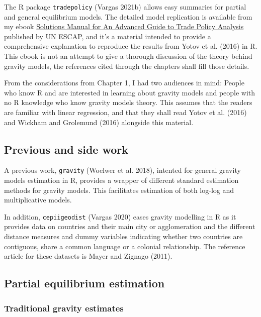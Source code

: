 \documentclass[12pt,reqno,oneside,pdftex]{formato-puc/puctesis} %
\begin{document}
The R package \texttt{tradepolicy} (Vargas 2021b) allows easy summaries
for partial and general equilibrium models. The detailed model
replication is available from my ebook
\href{https://r.tiid.org/R_structural_gravity/}{Solutions Manual for An
Advanced Guide to Trade Policy Analysis} published by UN ESCAP, and it's
a material intended to provide a comprehensive explanation to reproduce
the results from Yotov et al. (2016) in R. This ebook is not an attempt
to give a thorough discussion of the theory behind gravity models, the
references cited through the chapters shall fill those details.

From the considerations from Chapter 1, I had two audiences in mind:
People who know R and are interested in learning about gravity models
and people with no R knowledge who know gravity models theory. This
assumes that the readers are familiar with linear regression, and that
they shall read Yotov et al. (2016) and Wickham and Grolemund (2016)
alongside this material.

\hypertarget{previous-and-side-work}{%
\subsection{Previous and side work}\label{previous-and-side-work}}

A previous work, \texttt{gravity} (Woelwer et al. 2018), intented for
general gravity models estimation in R, provides a wrapper of different
standard estimation methods for gravity models. This facilitates
estimation of both log-log and multiplicative models.

In addition, \texttt{cepiigeodist} (Vargas 2020) eases gravity modelling
in R as it provides data on countries and their main city or
agglomeration and the different distance measures and dummy variables
indicating whether two countries are contiguous, share a common language
or a colonial relationship. The reference article for these datasets is
Mayer and Zignago (2011).

\hypertarget{partial-equilibrium-estimation}{%
\subsection{Partial equilibrium
estimation}\label{partial-equilibrium-estimation}}

\hypertarget{traditional-gravity-estimates}{%
\subsubsection{Traditional gravity
estimates}\label{traditional-gravity-estimates}}
\end{document}
